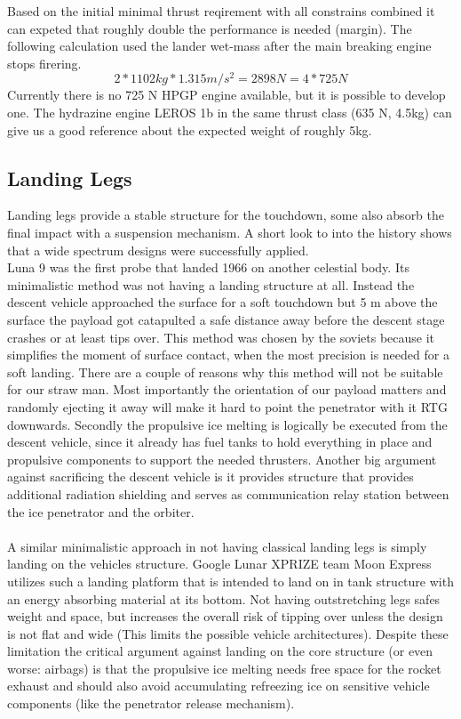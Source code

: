 Based on the initial minimal thrust reqirement with all constrains combined it can expeted that roughly double the performance is needed (margin). The following calculation used the lander wet-mass after the main breaking engine stops firering.
$$2 * 1102 kg * 1.315 m/s^2 = 2898 N = 4 * 725 N$$
Currently there is no 725 N HPGP engine available, but it is possible to develop one. The hydrazine engine LEROS 1b in the same thrust class (635 N, 4.5kg) can give us a good reference about the expected weight of roughly 5kg.


\subsection{Landing Legs}
Landing legs provide a stable structure for the touchdown, some also absorb the final impact with a suspension mechanism. A short look to into the history shows that a wide spectrum designs were successfully applied.\\
 Luna 9 was the first probe that landed 1966 on another celestial body. Its minimalistic method was not having a landing structure at all. Instead the descent vehicle approached the surface for a soft touchdown but 5 m above the surface the payload got catapulted a safe distance away before the descent stage crashes or at least tips over. This method was chosen by the soviets because it simplifies the moment of surface contact, when the most precision is needed for a soft landing. There are a couple of reasons why this method will not be suitable for our straw man. Most importantly the orientation of our payload matters and randomly ejecting it away will make it hard to point the penetrator with it RTG downwards. Secondly the propulsive ice melting is logically be executed from the descent vehicle, since it already has fuel tanks to hold everything in place and propulsive components to support the needed thrusters.  Another big argument against sacrificing the descent vehicle is it provides structure that provides additional radiation shielding and serves as communication relay station between the ice penetrator and the orbiter.\\
\\
A similar minimalistic approach in not having classical landing legs is simply landing on the vehicles structure. Google Lunar XPRIZE team Moon Express utilizes such a landing platform that is intended to land on in tank structure with an energy absorbing material at its bottom. Not having outstretching legs safes weight and space, but increases the overall risk of tipping over unless the design is not flat and wide (This limits the possible vehicle architectures). Despite these limitation the critical argument against landing on the core structure (or even worse: airbags) is that the propulsive ice melting needs free space for the rocket exhaust and should also avoid accumulating refreezing ice on sensitive vehicle components (like the penetrator release mechanism).\\
